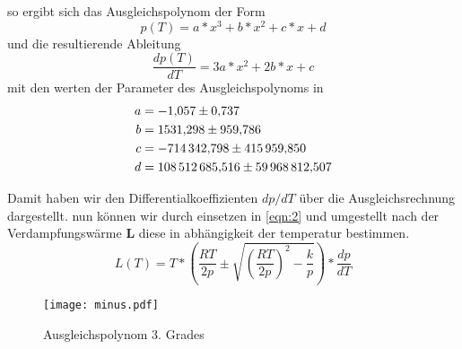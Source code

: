 so ergibt sich das Ausgleichspolynom der Form 
\begin{equation*}
  p(T) = a * x^3 + b * x^2 + c * x + d 
\end{equation*}
und die resultierende Ableitung
\begin{equation*}
  \frac{dp(T)}{dT} = 3a * x^2 + 2b * x + c 
\end{equation*}
mit den werten der Parameter des Ausgleichspolynoms in
\begin{align*}
  a &= \num{-1.057 +- 0.737}\\
  b &= \num{1531.298 +- 959.786}\\
  c &= \num{-714342.798 +- 415959.850}\\
  d &= \num{108512685.516 +- 59968812.507}\\
\end{align*}

Damit haben wir den Differentialkoeffizienten $dp/dT$ über die Ausgleichsrechnung dargestellt. 
nun können wir durch einsetzen in \autoref{eqn:2} und umgestellt nach der Verdampfungswärme $\symbf{L}$
diese in abhängigkeit der temperatur bestimmen.
\begin{equation}
L(T) = T * \left(\frac{RT}{2p}\pm\sqrt{\left(\frac{RT}{2p}\right)^2-\frac{k}{p}}\right) * \frac{dp}{dT}
\end{equation}

\begin{figure}[H]
  \centering
  \texttt{[image: minus.pdf]}
  \label{fig:2}
  \caption{Ausgleichspolynom 3. Grades}
\end{figure}


